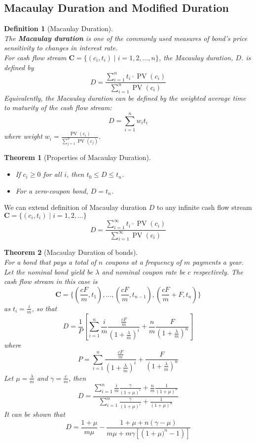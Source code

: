 \documentclass[12pt]{article}
\newtheorem{definition}{Definition}[section]
\newtheorem{theorem}{Theorem}[section]
\theoremstyle{definition}
\DeclareMathOperator{\PV}{PV}
\newcommand\cf[1]{\mathbf{#1}}
\begin{document}
\subsection{Macaulay Duration and Modified Duration}
\begin{definition}[Macaulay Duration]
\hfill\\\normalfont The \textbf{Macaulay duration} is one of the commonly used measures of bond's price sensitivity to changes in interest rate.\\
For cash flow stream $\cf{C}=\{(c_i,t_i)\mid i = 1, 2, \ldots, n\}$, the Macaulay duration, $D$. is defined by
\[
D=\frac{\sum_{i=1}^nt_i\cdot\PV(c_i)}{\sum_{i=1}^n\PV(c_i)}
\]
Equivalently, the Macaulay duration can be defined by the weighted average time to maturity of the cash flow stream:
\[
D=\sum_{i=1}^nw_it_i
\]
where weight $w_i = \frac{\PV(c_i)}{\sum_{j=1}^n\PV(c_j)}$.
\end{definition}
\begin{theorem}[Properties of Macaulay Duration]\hfill\\\normalfont
\begin{itemize}
  \item If $c_i\geq 0$ for all $i$, then $t_0\leq D\leq t_n$.
  \item For a zero-coupon bond, $D=t_n$.
\end{itemize}
\end{theorem}
We can extend definition of Macaulay duration $D$ to any infinite cash flow stream $\cf{C}=\{(c_i,t_i)\mid i = 1, 2,\ldots\}$
\[
D=\frac{\sum_{i=1}^\infty t_i\cdot\PV(c_i)}{\sum_{i=1}^\infty\PV(c_i)}
\] 
\begin{theorem}[Macaulay Duration of bonds]\hfill\\\normalfont
For a bond that pays a total of $n$ coupons at a frequency of $m$ payments a year. Let the nominal bond yield be $\lambda$ and nominal coupon rate be $c$ respectively. The cash flow stream in this case is
\[
\cf{C}=\{(\frac{cF}{m}, t_1),\ldots, (\frac{cF}{m},t_{n-1}),(\frac{cF}{m}+F,t_n)\}
\]
as $t_i = \frac{i}{m}$, so that
\[
D=\frac{1}{P}\left[\sum_{i=1}^n\frac{i}{m}\frac{\frac{cF}{m}}{\left(1+\frac{\lambda}{m}\right)^i}+\frac{n}{m}\frac{F}{\left(1+\frac{\lambda}{m}\right)^n}\right]
\]
where
\[
P=\sum_{i=1}^n\frac{\frac{cF}{m}}{\left(1+\frac{\lambda}{m}\right)^i}+\frac{F}{\left(1+\frac{\lambda}{m}\right)^n}
\]
Let $\mu = \frac{\lambda}{m}$ and $\gamma = \frac{c}{m}$, then
\[
D = \frac{\sum_{i=1}^n\frac{i}{m}\frac{\gamma}{(1+\mu)^i}+\frac{n}{m}\frac{1}{(1+\mu)^n}}{\sum_{i=1}^n\frac{\gamma}{(1+\mu)^i}+\frac{1}{(1+\mu)^n}}
\]
It can be shown that
\[
D = \frac{1+\mu}{m\mu}-\frac{1+\mu+n(\gamma-\mu)}{m\mu+m\gamma\left[\left(1+\mu)^n-1\right)\right]}
\]
\end{theorem}
\end{document}
